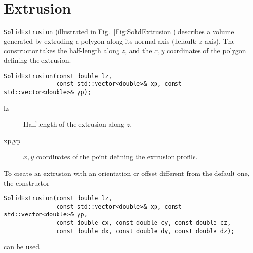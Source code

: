 \section{Extrusion}
\texttt{SolidExtrusion} (illustrated in Fig.~\ref{Fig:SolidExtrusion})
describes a volume
generated by extruding a polygon along its normal axis (default: $z$-axis).
The constructor takes the half-length along 
$z$, and the $x, y$ coordinates of the polygon defining the extrusion. 
\begin{lstlisting}
SolidExtrusion(const double lz,
               const std::vector<double>& xp, const std::vector<double>& yp); 
\end{lstlisting} 
\begin{description}
  \item[lz] Half-length of the extrusion along $z$.
  \item[xp,yp] $x,y$ coordinates of the point defining the extrusion profile.
\end{description}
To create an extrusion with an orientation or offset different from the 
default one, the constructor
\begin{lstlisting}
SolidExtrusion(const double lz,
               const std::vector<double>& xp, const std::vector<double>& yp,
               const double cx, const double cy, const double cz,
               const double dx, const double dy, const double dz); 
\end{lstlisting} 
can be used.

